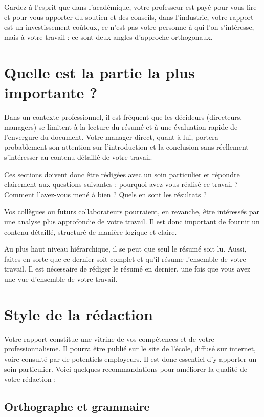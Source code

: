 Gardez à l'esprit que dans l'académique, votre professeur est payé pour vous lire et pour vous apporter du soutien et des conseils, dans l'industrie, votre rapport est un investissement coûteux, ce n'est pas votre personne à qui l'on s'intéresse, mais à votre travail : ce sont deux angles d'approche orthogonaux.

\section{Quelle est la partie la plus importante ?}

Dans un contexte professionnel, il est fréquent que les décideurs (directeurs, managers) se limitent à la lecture du résumé et à une évaluation rapide de l'envergure du document. Votre manager direct, quant à lui, portera probablement son attention sur l'introduction et la conclusion sans réellement s'intéresser au contenu détaillé de votre travail.

Ces sections doivent donc être rédigées avec un soin particulier et répondre clairement aux questions suivantes : pourquoi avez-vous réalisé ce travail ? Comment l'avez-vous mené à bien ? Quels en sont les résultats ?

Vos collègues ou futurs collaborateurs pourraient, en revanche, être intéressés par une analyse plus approfondie de votre travail. Il est donc important de fournir un contenu détaillé, structuré de manière logique et claire.

Au plus haut niveau hiérarchique, il se peut que seul le résumé soit lu. Aussi, faites en sorte que ce dernier soit complet et qu'il résume l'ensemble de votre travail. Il est nécessaire de rédiger le résumé en dernier, une fois que vous avez une vue d'ensemble de votre travail.

\section{Style de la rédaction}

Votre rapport constitue une vitrine de vos compétences et de votre professionnalisme. Il pourra être publié sur le site de l'école, diffusé sur internet, voire consulté par de potentiels employeurs. Il est donc essentiel d'y apporter un soin particulier. Voici quelques recommandations pour améliorer la qualité de votre rédaction :

\subsection{Orthographe et grammaire}

